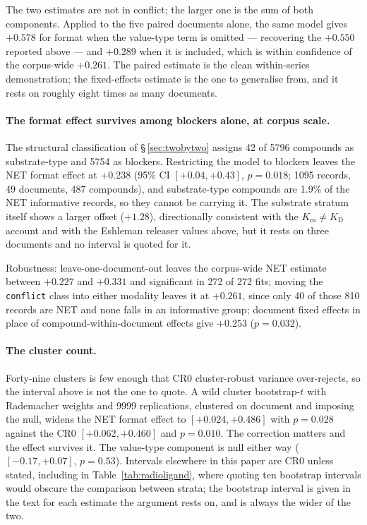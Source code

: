 \documentclass[11pt,a4paper]{article}
\begin{document}
The two estimates are not in conflict; the larger one is the sum of both components.
Applied to the five paired documents alone, the same model gives $+0.578$ for format
when the value-type term is omitted --- recovering the $+0.550$ reported above --- and
$+0.289$ when it is included, which is within confidence of the corpus-wide $+0.261$.
The paired estimate is the clean within-series demonstration; the fixed-effects
estimate is the one to generalise from, and it rests on roughly eight times as many
documents.

\paragraph{The format effect survives among blockers alone, at corpus scale.} The
structural classification of \S\,\ref{sec:twobytwo} assigns 42 of 5796 compounds as
substrate-type and 5754 as blockers. Restricting the model to blockers leaves the NET
format effect at $+0.238$ (95\% CI $[+0.04,+0.43]$, $p=0.018$; 1095 records, 49
documents, 487 compounds), and substrate-type compounds are 1.9\% of the NET
informative records, so they cannot be carrying it. The substrate stratum itself shows
a larger offset ($+1.28$), directionally consistent with the $K_\mathrm{m}\neq
K_\mathrm{D}$ account \cite{Schomig1988} and with the Eshleman releaser values above,
but it rests on three documents and no interval is quoted for it.

Robustness: leave-one-document-out leaves the corpus-wide NET estimate between $+0.227$
and $+0.331$ and significant in 272 of 272 fits; moving the \texttt{conflict} class
into either modality leaves it at $+0.261$, since only 40 of those 810 records are NET
and none falls in an informative group; document fixed effects in place of
compound-within-document effects give $+0.253$ ($p=0.032$).

\paragraph{The cluster count.} Forty-nine clusters is few enough that CR0 cluster-robust
variance over-rejects, so the interval above is not the one to quote. A wild cluster
bootstrap-$t$ with Rademacher weights and 9999 replications, clustered on document and
imposing the null, widens the NET format effect to $[+0.024,+0.486]$ with $p=0.028$
against the CR0 $[+0.062,+0.460]$ and $p=0.010$. The correction matters and the effect
survives it. The value-type component is null either way ($[-0.17,+0.07]$, $p=0.53$). Intervals
elsewhere in this paper are CR0 unless stated, including in
Table~\ref{tab:radioligand}, where quoting ten bootstrap intervals would obscure the
comparison between strata; the bootstrap interval is given in the text for each estimate
the argument rests on, and is always the wider of the two.
\end{document}
